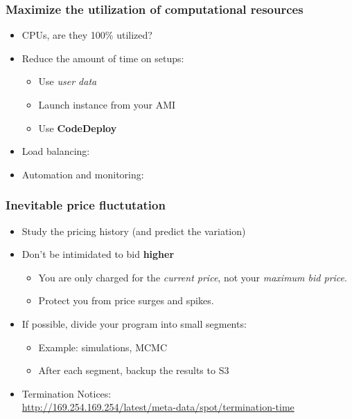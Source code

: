\documentclass[10pt]{beamer}
\begin{document}
\begin{frame}
    \frametitle{Maximize the utilization of computational resources}
    \begin{itemize}
        \item CPUs, are they 100\% utilized? 
        \item Reduce the amount of time on setups:
            \begin{itemize}
                \item Use {\it user data}
                \item Launch instance from your AMI
                \item Use {\bf CodeDeploy}
            \end{itemize}
        \item Load balancing: 
        \item Automation and monitoring:
    \end{itemize}
\end{frame}

\begin{frame}
    \frametitle{Inevitable price fluctutation}
    \begin{itemize}
        \item Study the pricing history (and predict the variation)
        \item Don't be intimidated to bid {\bf higher}
            \begin{itemize}
                \item You are only charged for the {\it current price}, not your {\it maximum bid price}.
                \item Protect you from price surges and spikes.
            \end{itemize}
        \item If possible, divide your program into small segments:
            \begin{itemize}
                \item Example: simulations, MCMC
                \item After each segment, backup the results to S3
            \end{itemize}
        \item Termination Notices:
            \\
            \url{http://169.254.169.254/latest/meta-data/spot/termination-time}
    \end{itemize}
\end{frame}
\end{document}
